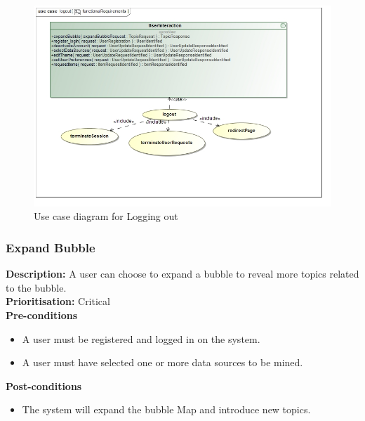 \documentclass[hidelinks,english]{article}
\begin{document}
    		\begin{figure}[!h]
    			\includegraphics[width=\linewidth]{logoutFunctionalRequirements.jpg}
    			\caption{Use case diagram for Logging out}
    			\label{UseCaseLogout}
    			\end{figure}
    			
    		
    			
    		\subsubsection{Expand Bubble}
				\textbf{Description:}  A user can choose to expand a bubble to reveal more topics related to the bubble.\\
			    \textbf{Prioritisation:} Critical\\
      			\textbf{Pre-conditions}
			    \begin{itemize}
			        \item A user must be registered and logged in on the system.
			        \item A user must have selected one or more data sources to be mined.
			    \end{itemize}
			    \textbf{Post-conditions}
			     \begin{itemize}
			        \item The system will expand the bubble Map and introduce new topics.
			    \end{itemize}
			    
\end{document}
